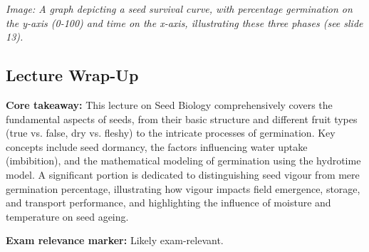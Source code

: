\textit{Image: A graph depicting a seed survival curve, with percentage germination on the y-axis (0-100) and time on the x-axis, illustrating these three phases (see slide 13).}


\subsection*{Lecture Wrap-Up} 
\textbf{Core takeaway:} This lecture on Seed Biology comprehensively covers the fundamental aspects of seeds, from their basic structure and different fruit types (true vs. false, dry vs. fleshy) to the intricate processes of germination. Key concepts include seed dormancy, the factors influencing water uptake (imbibition), and the mathematical modeling of germination using the hydrotime model. A significant portion is dedicated to distinguishing seed vigour from mere germination percentage, illustrating how vigour impacts field emergence, storage, and transport performance, and highlighting the influence of moisture and temperature on seed ageing. 

\vspace{1em} 
\textbf{Exam relevance marker:} Likely exam-relevant.
